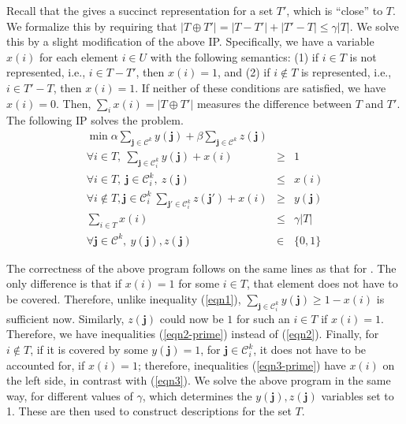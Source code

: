 Recall that the \minapproxdesc{} gives a succinct representation for a set $T'$,
which is ``close'' to $T$. We formalize this by requiring that 
$|T\oplus T'|=|T-T'| + |T'-T|\leq \gamma|T|$.
We solve this by a slight modification of the above IP.
Specifically, we have a variable $x(i)$ for each element $i\in U$
with the following semantics: 
(1) if $i\in T$ is not represented, i.e., $i\in T-T'$, then $x(i)=1$, and
(2) if $i\not\in T$ is represented, i.e., $i\in T'-T$, then $x(i)=1$.
If neither of these conditions are satisfied, we have $x(i)=0$.
Then, $\sum_i x(i) = |T\oplus T'|$ measures the difference between $T$ and $T'$.
The following IP solves the \minapproxdesc{} problem.
\begin{eqnarray}
\nonumber
\min \alpha \sum_{\mathbf{j}\in\mathcal{C}^k} y(\mathbf{j}) + 
\beta \sum_{\mathbf{j}\in\mathcal{C}^k} z(\mathbf{j}) && \\
\label{eqn1-prime}
\forall i\in T,\ \sum_{\mathbf{j}\in\mathcal{C}^k_i} y(\mathbf{j}) + x(i) &\geq& 1\\
\label{eqn2-prime}
\forall i\in T,\ \mathbf{j}\in\mathcal{C}^k_i,\ z(\mathbf{j}) &\leq& x(i)\\
\label{eqn3-prime}
\forall i\not\in T, \mathbf{j}\in \mathcal{C}^k_i\ \sum_{\mathbf{j'}\in\mathcal{C}^k_i} z(\mathbf{j'}) + x(i) &\geq& y(\mathbf{j})\\
\label{eqn:relax}
\sum_{i\in T} x(i) &\leq& \gamma|T|\\
\nonumber
\forall \mathbf{j}\in \mathcal{C}^k,\ y(\mathbf{j}), z(\mathbf{j}) &\in& \{0, 1\}
\end{eqnarray}

The correctness of the above program follows on the same lines as that for \mindesc{}.
The only difference is that if $x(i)=1$ for some $i\in T$, that element does not have
to be covered. Therefore, unlike inequality (\ref{eqn1}), 
$\sum_{\mathbf{j}\in\mathcal{C}^k_i} y(\mathbf{j})\geq 1-x(i)$ is sufficient now.
Similarly, $z(\mathbf{j})$ could now be $1$ for such an $i\in T$ if $x(i)=1$. Therefore,
we have inequalities (\ref{eqn2-prime}) instead of (\ref{eqn2}).
Finally, for $i\not\in T$, if it is covered by some $y(\mathbf{j})=1$, for
$\mathbf{j}\in \mathcal{C}^k_i$, it does not have to be accounted for, if $x(i)=1$;
therefore, inequalities (\ref{eqn3-prime}) have $x(i)$ on the left side,
in contrast with (\ref{eqn3}). We solve the above program in the same way,
for different values of $\gamma$, which determines the $y(\mathbf{j}), z(\mathbf{j})$
variables set to 1. These are then used to construct descriptions for the set $T$.


